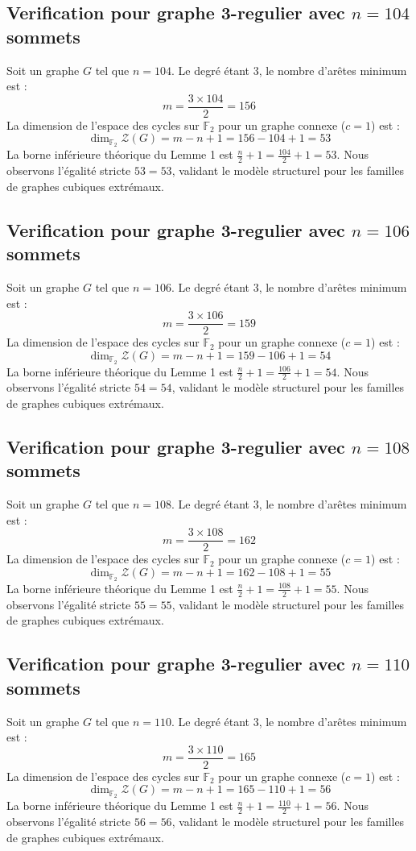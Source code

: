 \documentclass[11pt,a4paper]{article}
\begin{document}
\subsection{Verification pour graphe 3-regulier avec $n=104$ sommets}
Soit un graphe $G$ tel que $n = 104$. Le degré étant 3, le nombre d'arêtes minimum est :
$$ m = \frac{3 \times 104}{2} = 156 $$
La dimension de l'espace des cycles sur $\mathbb{F}_2$ pour un graphe connexe ($c=1$) est :
$$ \dim_{\mathbb{F}_2} \mathcal{Z}(G) = m - n + 1 = 156 - 104 + 1 = 53 $$
La borne inférieure théorique du Lemme 1 est $\frac{n}{2} + 1 = \frac{104}{2} + 1 = 53$.
Nous observons l'égalité stricte $53 = 53$, validant le modèle structurel pour les familles de graphes cubiques extrémaux.

\subsection{Verification pour graphe 3-regulier avec $n=106$ sommets}
Soit un graphe $G$ tel que $n = 106$. Le degré étant 3, le nombre d'arêtes minimum est :
$$ m = \frac{3 \times 106}{2} = 159 $$
La dimension de l'espace des cycles sur $\mathbb{F}_2$ pour un graphe connexe ($c=1$) est :
$$ \dim_{\mathbb{F}_2} \mathcal{Z}(G) = m - n + 1 = 159 - 106 + 1 = 54 $$
La borne inférieure théorique du Lemme 1 est $\frac{n}{2} + 1 = \frac{106}{2} + 1 = 54$.
Nous observons l'égalité stricte $54 = 54$, validant le modèle structurel pour les familles de graphes cubiques extrémaux.

\subsection{Verification pour graphe 3-regulier avec $n=108$ sommets}
Soit un graphe $G$ tel que $n = 108$. Le degré étant 3, le nombre d'arêtes minimum est :
$$ m = \frac{3 \times 108}{2} = 162 $$
La dimension de l'espace des cycles sur $\mathbb{F}_2$ pour un graphe connexe ($c=1$) est :
$$ \dim_{\mathbb{F}_2} \mathcal{Z}(G) = m - n + 1 = 162 - 108 + 1 = 55 $$
La borne inférieure théorique du Lemme 1 est $\frac{n}{2} + 1 = \frac{108}{2} + 1 = 55$.
Nous observons l'égalité stricte $55 = 55$, validant le modèle structurel pour les familles de graphes cubiques extrémaux.

\subsection{Verification pour graphe 3-regulier avec $n=110$ sommets}
Soit un graphe $G$ tel que $n = 110$. Le degré étant 3, le nombre d'arêtes minimum est :
$$ m = \frac{3 \times 110}{2} = 165 $$
La dimension de l'espace des cycles sur $\mathbb{F}_2$ pour un graphe connexe ($c=1$) est :
$$ \dim_{\mathbb{F}_2} \mathcal{Z}(G) = m - n + 1 = 165 - 110 + 1 = 56 $$
La borne inférieure théorique du Lemme 1 est $\frac{n}{2} + 1 = \frac{110}{2} + 1 = 56$.
Nous observons l'égalité stricte $56 = 56$, validant le modèle structurel pour les familles de graphes cubiques extrémaux.
\end{document}
